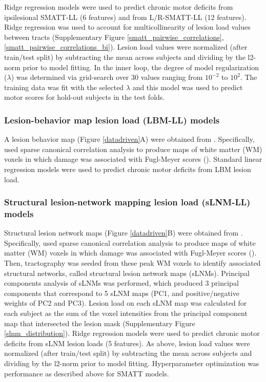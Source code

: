 \documentclass[10pt]{article}
\begin{document}
Ridge regression models were used to predict chronic motor deficits from ipsilesional SMATT-LL (6 features) and from L/R-SMATT-LL (12 features). Ridge regression was used to account for multicollinearity of lesion load values between tracts (Supplementary Figure \ref{smatt_pairwise_correlations}, \ref{smatt_pairwise_correlations_bi}). Lesion load values were normalized (after train/test split) by subtracting the mean across subjects and dividing by the l2-norm prior to model fitting. In the inner loop, the degree of model regularization  ($\lambda$) was determined via grid-search over 30 values ranging from $10^{-2}$ to $10^2$. The training data was fit with the selected $\lambda$ and this model was used to predict motor scores for hold-out subjects in the test folds.

\subsubsection*{Lesion-behavior map lesion load (LBM-LL) models}
A lesion behavior map (Figure \ref{datadriven}A) were obtained from \cite{Bowren2022-rs}. Specifically, \cite{Bowren2022-rs} used sparse canonical correlation analysis to produce maps of white matter (WM) voxels in which damage was associated with Fugl-Meyer scores (\cite{Pustina2018-xv}). Standard linear regression models were used to predict chronic motor deficits from LBM lesion load. 

\subsubsection*{Structural lesion-network mapping lesion load (sLNM-LL) models}
Structural lesion network maps (Figure \ref{datadriven}B) were obtained from \cite{Bowren2022-rs}. Specifically, \cite{Bowren2022-rs} used sparse canonical correlation analysis to produce maps of white matter (WM) voxels in which damage was associated with Fugl-Meyer scores (\cite{Pustina2018-xv}). Then, tractography was seeded from these peak WM voxels to identify associated structural networks, called structural lesion network maps (sLNMs). Principal components analysis of sLNMs was performed, which produced 3 principal components that correspond to 5 sLNM maps (PC1, and positive/negative weights of PC2 and PC3). Lesion load on each sLNM map was calculated for each subject as the sum of the voxel intensities from the principal component map that intersected the lesion mask (Supplementary Figure \ref{slnm_distribution}). Ridge regression models were used to predict chronic motor deficits from sLNM lesion loads (5 features). As above, lesion load values were normalized (after train/test split) by subtracting the mean across subjects and dividing by the l2-norm prior to model fitting. Hyperparameter optimization was performance as described above for SMATT models.
\end{document}
